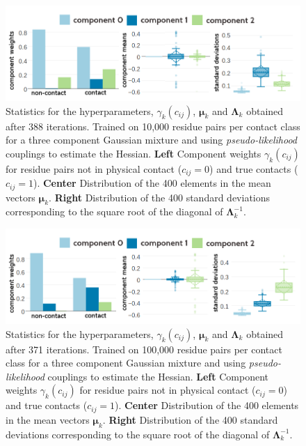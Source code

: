 \documentclass[11pt,a4paper,twoside]{book}
\newcommand{\eq}{\!=\!}
\newcommand{\Lk}{\mathbf{\Lambda}_k}
\newcommand{\muk}{\mathbf{\mu}_k}
\newcommand{\cij}{c_{ij}}
\theoremstyle{definition}
\theoremstyle{definition}
\theoremstyle{remark}
\begin{document}
\begin{figure}
\includegraphics[width=1\linewidth]{img/bayesian_model/pll/3/stats-pll-3comp-10k} \caption{Statistics for the hyperparameters,
\(\gamma_k(\cij)\), \(\muk\) and \(\Lk\) obtained after 388 iterations.
Trained on 10,000 residue pairs per contact class for a three component
Gaussian mixture and using \emph{pseudo-likelihood} couplings to
estimate the Hessian. \textbf{Left} Component weights \(\gamma_k(\cij)\)
for residue pairs not in physical contact (\(\cij \eq 0\)) and true
contacts (\(\cij \eq 1\)). \textbf{Center} Distribution of the 400
elements in the mean vectors \(\muk\). \textbf{Right} Distribution of
the 400 standard deviations corresponding to the square root of the
diagonal of \(\Lk^{-1}\).}\label{fig:stats-pll-3comp-10k}
\end{figure}












\begin{figure}
\includegraphics[width=1\linewidth]{img/bayesian_model/pll/3/stats-pll-3comp-100k} \caption{Statistics for the hyperparameters,
\(\gamma_k(\cij)\), \(\muk\) and \(\Lk\) obtained after 371 iterations.
Trained on 100,000 residue pairs per contact class for a three component
Gaussian mixture and using \emph{pseudo-likelihood} couplings to
estimate the Hessian. \textbf{Left} Component weights \(\gamma_k(\cij)\)
for residue pairs not in physical contact (\(\cij \eq 0\)) and true
contacts (\(\cij \eq 1\)). \textbf{Center} Distribution of the 400
elements in the mean vectors \(\muk\). \textbf{Right} Distribution of
the 400 standard deviations corresponding to the square root of the
diagonal of \(\Lk^{-1}\).}\label{fig:stats-pll-3comp-100k}
\end{figure}
\end{document}
